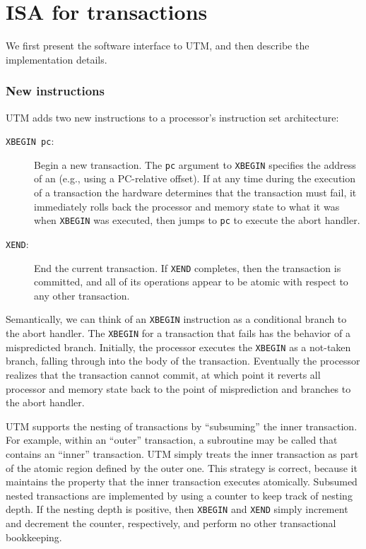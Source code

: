 
\section{ISA for transactions}\label{sec:isa}
  We first present the
software interface to UTM, and then describe the implementation
details.

\subsubsection{New instructions}

UTM adds two new instructions to a processor's instruction set
architecture:
\begin{description}
\item[\texttt{XBEGIN pc}:] Begin a new transaction.  The
\texttt{pc} argument to \texttt{XBEGIN} specifies
the address of an  (e.g., using a PC-relative offset).
If at any time during the execution of a transaction the hardware determines
that the transaction must fail, it immediately rolls back the
processor and memory state to what it was when \texttt{XBEGIN} was
executed, then jumps to \texttt{pc} to execute the abort handler.
 
\item[\texttt{XEND}:] End the current transaction.  If \texttt{XEND}
completes, then the transaction is committed, and all of its
operations appear to be atomic with respect to any other transaction.
\end{description}

Semantically, we can think of an \texttt{XBEGIN} instruction as a
conditional branch to the abort handler.  The \texttt{XBEGIN} for a
transaction that fails has the behavior of a mispredicted branch.
Initially, the processor executes the \texttt{XBEGIN} as a not-taken
branch, falling through into the body of the transaction.  Eventually
the processor realizes that the transaction cannot commit, at which
point it reverts all processor and memory state back to the point of
misprediction and branches to the abort handler.

UTM supports the nesting of transactions by ``subsuming'' the inner
transaction.  For example, within an ``outer'' transaction, a
subroutine may be called that contains an ``inner'' transaction.
UTM simply treats the inner transaction as part of the atomic
region defined by the outer one.  This strategy is correct, because it
maintains the property that the inner transaction executes atomically.
Subsumed nested transactions are implemented by using a counter to
keep track of nesting depth.  If the nesting depth is positive, then
\texttt{XBEGIN} and \texttt{XEND} simply increment and decrement the
counter, respectively, and perform no other transactional bookkeeping.

